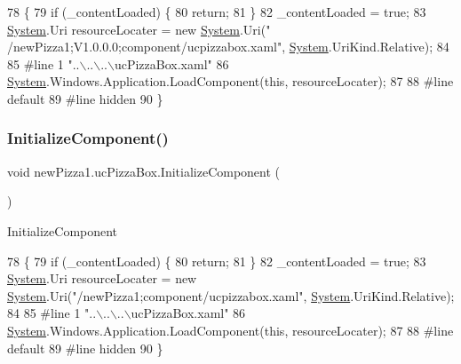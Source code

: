 \begin{DoxyCode}
78                                           \{
79             \textcolor{keywordflow}{if} (\_contentLoaded) \{
80                 \textcolor{keywordflow}{return};
81             \}
82             \_contentLoaded = \textcolor{keyword}{true};
83             \hyperlink{namespaceSystem}{System}.Uri resourceLocater = \textcolor{keyword}{new} \hyperlink{namespaceSystem}{System}.Uri(\textcolor{stringliteral}{"
      /newPizza1;V1.0.0.0;component/ucpizzabox.xaml"}, \hyperlink{namespaceSystem}{System}.UriKind.Relative);
84             
85 \textcolor{preprocessor}{            #line 1 "..\(\backslash\)..\(\backslash\)..\(\backslash\)ucPizzaBox.xaml"}
86             \hyperlink{namespaceSystem}{System}.Windows.Application.LoadComponent(\textcolor{keyword}{this}, resourceLocater);
87             
88 \textcolor{preprocessor}{            #line default}
89 \textcolor{preprocessor}{            #line hidden}
90         \}
\end{DoxyCode}
\mbox{\label{classnewPizza1_1_1ucPizzaBox_a0bf3486ff05489987fc9b6766aec72d1}} 
\subsubsection{\texorpdfstring{Initialize\+Component()}{InitializeComponent()}\hspace{0.1cm}{\footnotesize\ttfamily [6/6]}}
{\footnotesize\ttfamily void new\+Pizza1.\+uc\+Pizza\+Box.\+Initialize\+Component (\begin{DoxyParamCaption}{ }\end{DoxyParamCaption})\hspace{0.3cm}{\ttfamily [inline]}}



Initialize\+Component 


\begin{DoxyCode}
78                                           \{
79             \textcolor{keywordflow}{if} (\_contentLoaded) \{
80                 \textcolor{keywordflow}{return};
81             \}
82             \_contentLoaded = \textcolor{keyword}{true};
83             \hyperlink{namespaceSystem}{System}.Uri resourceLocater = \textcolor{keyword}{new} \hyperlink{namespaceSystem}{System}.Uri(\textcolor{stringliteral}{"/newPizza1;component/ucpizzabox.xaml"},
       \hyperlink{namespaceSystem}{System}.UriKind.Relative);
84             
85 \textcolor{preprocessor}{            #line 1 "..\(\backslash\)..\(\backslash\)..\(\backslash\)ucPizzaBox.xaml"}
86             \hyperlink{namespaceSystem}{System}.Windows.Application.LoadComponent(\textcolor{keyword}{this}, resourceLocater);
87             
88 \textcolor{preprocessor}{            #line default}
89 \textcolor{preprocessor}{            #line hidden}
90         \}
\end{DoxyCode}


